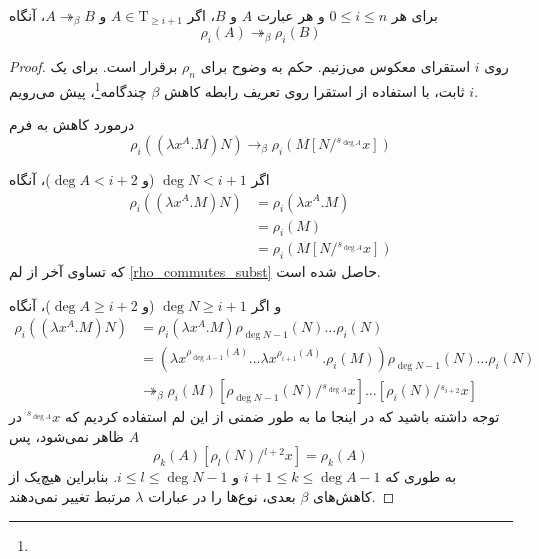 \begin{lmm}\label{rho_commutes_beta}
برای هر
$0 \le i \le n$
و هر عبارت
$A$ و $B$،
اگر
$A \in \mathrm{T}_{\ge i+1}$ و $A \twoheadrightarrow_\beta B$، آنگاه
\begin{equation*}
\rho_i(A) \twoheadrightarrow_\beta \rho_i(B)
\end{equation*}
\end{lmm}

\begin{proof}
روی
$i$
استقرای معکوس می‌زنیم.
حکم به وضوح برای
$\rho_n$
برقرار است.
برای یک
$i$
ثابت، با استفاده از استقرا روی تعریف رابطه کاهش
$\beta$
چندگامه\footnote{}، پیش می‌رویم.

درمورد کاهش به فرم
\begin{equation*}
\rho_i((\lambda x^A.M)N) \rightarrow_{\beta} \rho_i(M[N/{}^{s_{\operatorname{deg} A}} x])
\end{equation*}

اگر
$\operatorname{deg} N < i + 1$ (و $\operatorname{deg} A < i + 2$)،
آنگاه
\begin{align*}
\rho_i((\lambda x^A.M)N)
&= \rho_i(\lambda x^A.M) \\
&= \rho_i(M) \\
&= \rho_i(M[N/{}^{s_{\operatorname{deg} A}} x])
\end{align*}
که تساوی آخر از لم
\ref{rho_commutes_subst}
حاصل شده است.

و اگر
$\operatorname{deg} N \ge i + 1$ (و $\operatorname{deg} A \ge i + 2$)،
آنگاه
\begin{align*}
\rho_i((\lambda x^A.M)N)
&= \rho_i(\lambda x^A.M) \rho_{\operatorname{deg} N - 1}(N) \dots \rho_{i}(N) \\
&= (\lambda x^{\rho_{\operatorname{deg} A - 1}(A)} \dots \lambda x^{\rho_{i+1}(A)}.\rho_i(M)) \rho_{\operatorname{deg} N - 1}(N) \dots \rho_{i}(N) \\
&\twoheadrightarrow_\beta \rho_i(M) [\rho_{\operatorname{deg} N - 1}(N)/{}^{s_{\operatorname{deg} A}} x] \dots [\rho_i(N)/{}^{s_{i+2}} x]
\end{align*}
توجه داشته باشید که در اینجا ما به طور ضمنی از این لم استفاده کردیم که
${}^{s_{\operatorname{deg} A}} x$ در $A$
ظاهر نمی‌شود، پس
\begin{equation*}
\rho_k(A)[\rho_l(N)/{}^{l + 2} x] = \rho_k(A)
\end{equation*}
به طوری که
$i + 1 \le k \le \operatorname{deg} A - 1$
و
$i \le l \le \operatorname{deg} N - 1$.
بنابراین هیچ‌یک از کاهش‌های
$\beta$
بعدی، نوع‌ها را در عبارات
$\lambda$
مرتبط تغییر نمی‌دهند.


\end{proof}

